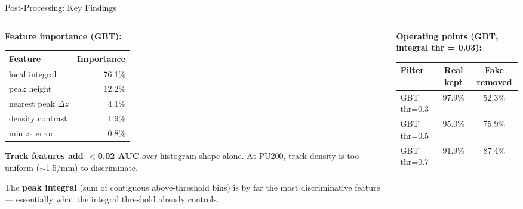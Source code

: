 \documentclass[xcolor=table,aspectratio=169]{beamer}
\begin{document}
\begin{frame}{Post-Processing: Key Findings}
    \begin{columns}[c]
        \begin{column}{0.48\linewidth}
            \small
            \textbf{Feature importance (GBT):}
            \vspace{0.3em}

            \begin{tabular}{lr}
                \hline
                \textbf{Feature} & \textbf{Importance} \\
                \hline
                local integral   & 76.1\% \\
                peak height      & 12.2\% \\
                nearest peak $\Delta z$  & 4.1\% \\
                density contrast & 1.9\% \\
                min $z_0$ error  & 0.8\% \\
                \hline
            \end{tabular}

            \vspace{0.6em}
            \textbf{Track features add $<$0.02 AUC} over histogram shape alone.
            At PU200, track density is too uniform ($\sim$1.5/mm) to discriminate.

            \vspace{0.4em}
            The \textbf{peak integral} (sum of contiguous above-threshold bins) is
            by far the most discriminative feature --- essentially what the integral
            threshold already controls.
        \end{column}
        \begin{column}{0.52\linewidth}
            \small
            \textbf{Operating points (GBT, integral thr = 0.03):}
            \vspace{0.3em}

            \begin{tabular}{lcc}
                \hline
                \textbf{Filter} & \textbf{Real kept} & \textbf{Fake removed} \\
                \hline
                GBT thr=0.3 & 97.9\% & 52.3\% \\
                GBT thr=0.5 & 95.0\% & 75.9\% \\
                GBT thr=0.7 & 91.9\% & 87.4\% \\
                \hline
            \end{tabular}


\end{column}
\end{columns}
\end{frame}
\end{document}
